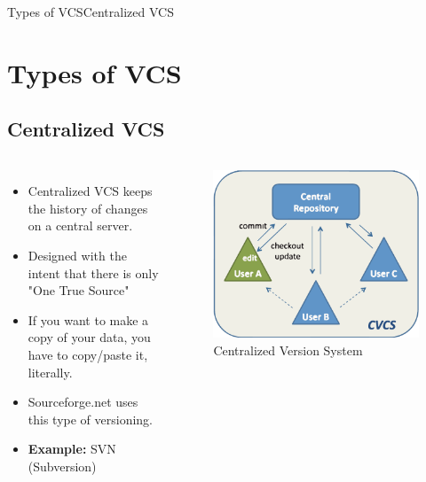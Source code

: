 \documentclass{beamer}
\begin{document}
\begin{frame}{Types of VCS}{Centralized VCS}
\section{Types of VCS}
\subsection{Centralized VCS}
  \begin{columns}
\begin{itemize}
  \item {
    Centralized VCS keeps the history of changes on a central server.
  }
  \item {
    Designed with the intent that there is only "One True Source"  
  }
  \item {
    If you want to make a copy of your data, you have to copy/paste it, literally.  
  }
  \item{
	Sourceforge.net uses this type of versioning.  
  }
  \item{
      \textbf{Example:} SVN (Subversion)
  }  
  \end{itemize}
\begin{figure}
	 \includegraphics[width=.9\textwidth]{images/cvcs}
	 \caption{Centralized Version System \cite{website}}
 \end{figure}
\end{columns}
\end{frame}	
\end{document}
